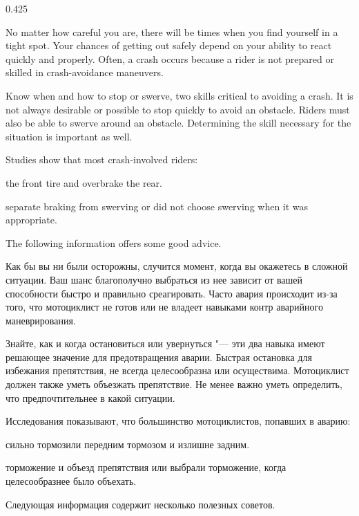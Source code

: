 



\begin{langblock}{0.425}
	\begin{eng}
		
	No matter how careful you are, there will be times when you find yourself in a tight spot. Your chances of getting out safely depend on your ability to react quickly and properly.  Often, a crash occurs because a rider is not prepared or skilled in crash-avoidance maneuvers.
	
	Know when and how to stop or swerve, two skills critical to avoiding a crash. It is not always desirable or possible to stop quickly to avoid an obstacle. Riders must also be able to swerve around an obstacle.  Determining the skill necessary for the situation is important as well.
	
	Studies show that most crash-involved riders:
	
	\begin{description}[noitemsep]
		\item [Underbrake] the front tire and overbrake the rear.
		\item [Did not] separate braking from swerving or did not choose swerving when it was appropriate.
	\end{description}
	
	The following information offers some good advice.
	\end{eng}
	\begin{rus}
		
		Как бы вы ни были осторожны, случится момент, когда вы окажетесь в сложной ситуации. Ваш шанс благополучно выбраться из нее зависит от вашей способности быстро и правильно среагировать. Часто авария происходит из-за того, что мотоциклист не готов или не владеет навыками контр аварийного маневрирования.
		
		Знайте, как и когда остановиться или увернуться "--- эти два навыка имеют решающее значение для предотвращения аварии. Быстрая остановка для избежания препятствия, не всегда целесообразна или осуществима. Мотоциклист должен также уметь объезжать препятствие. Не менее важно уметь определить, что предпочтительнее в какой ситуации.
		
		Исследования показывают, что большинство мотоциклистов, попавших в аварию:
		
		\begin{description}[noitemsep]
		\item [Недостаточно] сильно тормозили передним тормозом и излишне задним.
		\item [Не разделили] торможение и объезд препятствия или выбрали торможение, когда целесообразнее было объехать.
		\end{description}
		Следующая информация содержит несколько полезных советов.
\end{rus}
\end{langblock}


